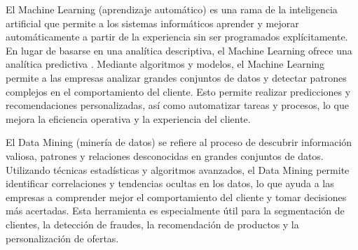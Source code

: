 El Machine Learning (aprendizaje automático) es una rama de la inteligencia artificial que permite a los sistemas informáticos aprender y mejorar automáticamente a partir de la experiencia sin ser programados explícitamente. En lugar de basarse en una analítica descriptiva, el Machine Learning ofrece una analítica predictiva \cite{inteligencia-negocios}. Mediante algoritmos y modelos, el Machine Learning permite a las empresas analizar grandes conjuntos de datos y detectar patrones complejos en el comportamiento del cliente. Esto permite realizar predicciones y recomendaciones personalizadas, así como automatizar tareas y procesos, lo que mejora la eficiencia operativa y la experiencia del cliente.

El Data Mining (minería de datos) se refiere al proceso de descubrir información valiosa, patrones y relaciones desconocidas en grandes conjuntos de datos. Utilizando técnicas estadísticas y algoritmos avanzados, el Data Mining permite identificar correlaciones y tendencias ocultas en los datos, lo que ayuda a las empresas a comprender mejor el comportamiento del cliente y tomar decisiones más acertadas. Esta herramienta es especialmente útil para la segmentación de clientes, la detección de fraudes, la recomendación de productos y la personalización de ofertas.
